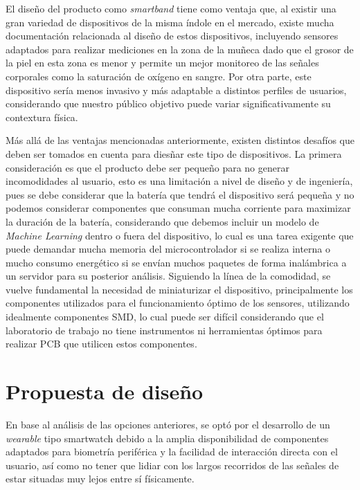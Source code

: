 \documentclass[letterpaper,11pt]{article}
\begin{document}

El diseño del producto como \textit{smartband} tiene como ventaja que, al existir una gran variedad de dispositivos de la misma índole en el mercado, existe mucha documentación relacionada al diseño de estos dispositivos, incluyendo sensores adaptados para realizar mediciones en la zona de la muñeca dado que el grosor de la piel en esta zona es menor y permite un mejor monitoreo de las señales corporales como la saturación de oxígeno en sangre. Por otra parte, este dispositivo sería menos invasivo y más adaptable a distintos perfiles de usuarios, considerando que nuestro público objetivo puede variar significativamente su contextura física.

Más allá de las ventajas mencionadas anteriormente, existen distintos desafíos que deben ser tomados en cuenta para diesñar este tipo de dispositivos. La primera consideración es que el producto debe ser pequeño para no generar incomodidades al usuario, esto es una limitación a nivel de diseño y de ingeniería, pues se debe considerar que la batería que tendrá el dispositivo será pequeña y no podemos considerar componentes que consuman mucha corriente para maximizar la duración de la batería, considerando que debemos incluir un modelo de \textit{Machine Learning} dentro o fuera del dispositivo, lo cual es una tarea exigente que puede demandar mucha memoria del microcontrolador si se realiza interna o mucho consumo energético si se envían muchos paquetes de forma inalámbrica a un servidor para su posterior análisis. Siguiendo la línea de la comodidad, se vuelve fundamental la necesidad de miniaturizar el dispositivo, principalmente los componentes utilizados para el funcionamiento óptimo de los sensores, utilizando idealmente componentes SMD, lo cual puede ser difícil considerando que el laboratorio de trabajo no tiene instrumentos ni herramientas óptimos para realizar PCB que utilicen estos componentes.


\section{Propuesta de diseño}

En base al análisis de las opciones anteriores, se optó por el desarrollo de un \textit{wearable} tipo smartwatch debido a la amplia disponibilidad de componentes adaptados para biometría periférica y la facilidad de interacción directa con el usuario, así como no tener que lidiar con los largos recorridos de las señales de estar situadas muy lejos entre sí físicamente.
\end{document}
